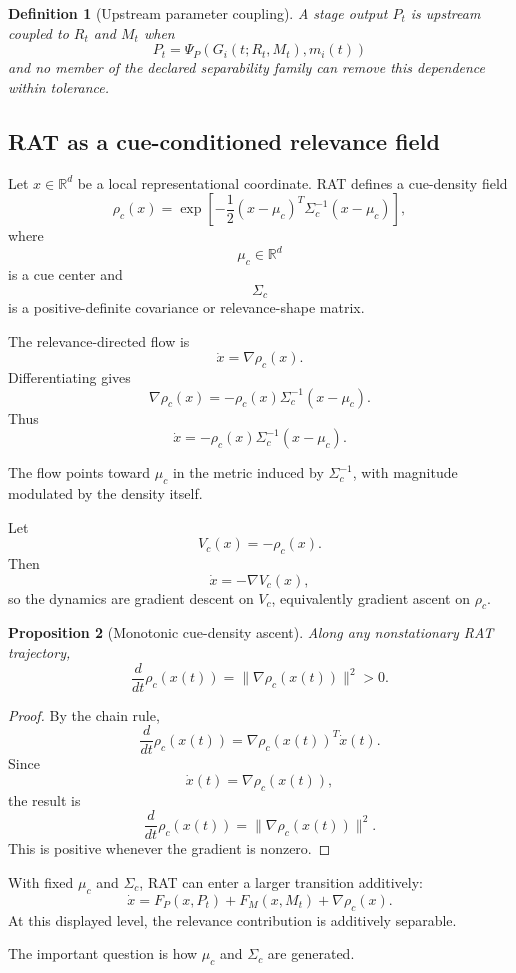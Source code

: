 \documentclass[11pt]{article}
\newtheorem{definition}{Definition}[section]
\newtheorem{proposition}[definition]{Proposition}
\theoremstyle{definition}
\newcommand{\R}{\mathbb{R}}
\begin{document}
\begin{definition}[Upstream parameter coupling]
A stage output \(P_t\) is upstream coupled to \(R_t\) and \(M_t\) when
\[
P_t
=
\Psi_P
\left(
G_i(t;R_t,M_t),
m_i(t)
\right)
\]
and no member of the declared separability family can remove this dependence within tolerance.
\end{definition}

\subsection{RAT as a cue-conditioned relevance field}

Let \(x\in\R^d\) be a local representational coordinate. RAT defines a cue-density field
\[
\rho_c(x)
=
\exp
\left[
-\frac12
(x-\mu_c)^T
\Sigma_c^{-1}
(x-\mu_c)
\right],
\]
where
\[
\mu_c\in\R^d
\]
is a cue center and
\[
\Sigma_c
\]
is a positive-definite covariance or relevance-shape matrix.

The relevance-directed flow is
\[
\dot x
=
\nabla\rho_c(x).
\]
Differentiating gives
\[
\nabla\rho_c(x)
=
-\rho_c(x)
\Sigma_c^{-1}
(x-\mu_c).
\]
Thus
\[
\dot x
=
-\rho_c(x)
\Sigma_c^{-1}
(x-\mu_c).
\]

The flow points toward \(\mu_c\) in the metric induced by \(\Sigma_c^{-1}\), with magnitude modulated by the density itself.

Let
\[
V_c(x)
=
-\rho_c(x).
\]
Then
\[
\dot x
=
-\nabla V_c(x),
\]
so the dynamics are gradient descent on \(V_c\), equivalently gradient ascent on \(\rho_c\).

\begin{proposition}[Monotonic cue-density ascent]
Along any nonstationary RAT trajectory,
\[
\frac{d}{dt}\rho_c(x(t))
=
\|\nabla\rho_c(x(t))\|^2
>
0.
\]
\end{proposition}

\begin{proof}
By the chain rule,
\[
\frac{d}{dt}\rho_c(x(t))
=
\nabla\rho_c(x(t))^T\dot x(t).
\]
Since
\[
\dot x(t)=\nabla\rho_c(x(t)),
\]
the result is
\[
\frac{d}{dt}\rho_c(x(t))
=
\|\nabla\rho_c(x(t))\|^2.
\]
This is positive whenever the gradient is nonzero.
\end{proof}

With fixed \(\mu_c\) and \(\Sigma_c\), RAT can enter a larger transition additively:
\[
\dot x
=
F_P(x,P_t)
+
F_M(x,M_t)
+
\nabla\rho_c(x).
\]
At this displayed level, the relevance contribution is additively separable.

The important question is how \(\mu_c\) and \(\Sigma_c\) are generated.
\end{document}
